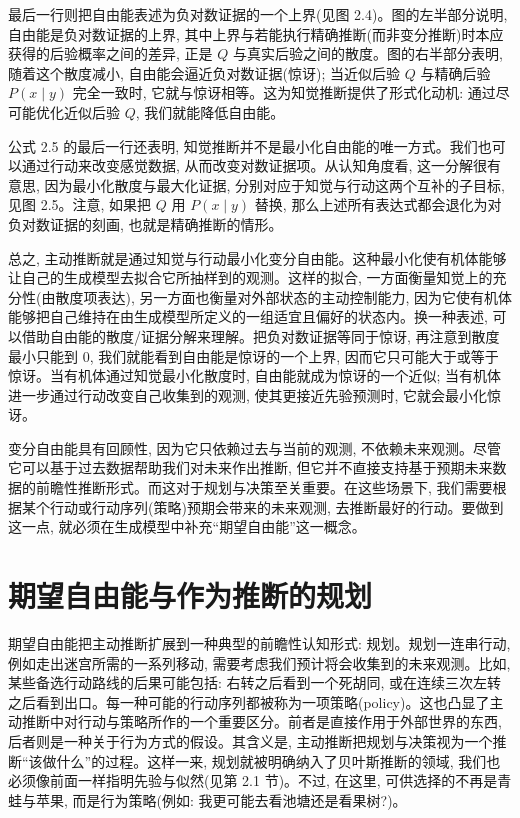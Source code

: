 最后一行则把自由能表述为负对数证据的一个上界(见图 2.4)。图的左半部分说明, 自由能是负对数证据的上界, 其中上界与若能执行精确推断(而非变分推断)时本应获得的后验概率之间的差异, 正是 $Q$ 与真实后验之间的散度。图的右半部分表明, 随着这个散度减小, 自由能会逼近负对数证据(惊讶); 当近似后验 $Q$ 与精确后验 $P(x \mid y)$ 完全一致时, 它就与惊讶相等。这为知觉推断提供了形式化动机: 通过尽可能优化近似后验 $Q$, 我们就能降低自由能。

公式 2.5 的最后一行还表明, 知觉推断并不是最小化自由能的唯一方式。我们也可以通过行动来改变感觉数据, 从而改变对数证据项。从认知角度看, 这一分解很有意思, 因为最小化散度与最大化证据, 分别对应于知觉与行动这两个互补的子目标, 见图 2.5。注意, 如果把 $Q$ 用 $P(x \mid y)$ 替换, 那么上述所有表达式都会退化为对负对数证据的刻画, 也就是精确推断的情形。

总之, 主动推断就是通过知觉与行动最小化变分自由能。这种最小化使有机体能够让自己的生成模型去拟合它所抽样到的观测。这样的拟合, 一方面衡量知觉上的充分性(由散度项表达), 另一方面也衡量对外部状态的主动控制能力, 因为它使有机体能够把自己维持在由生成模型所定义的一组适宜且偏好的状态内。换一种表述, 可以借助自由能的散度/证据分解来理解。把负对数证据等同于惊讶, 再注意到散度最小只能到 $0$, 我们就能看到自由能是惊讶的一个上界, 因而它只可能大于或等于惊讶。当有机体通过知觉最小化散度时, 自由能就成为惊讶的一个近似; 当有机体进一步通过行动改变自己收集到的观测, 使其更接近先验预测时, 它就会最小化惊讶。

变分自由能具有回顾性, 因为它只依赖过去与当前的观测, 不依赖未来观测。尽管它可以基于过去数据帮助我们对未来作出推断, 但它并不直接支持基于预期未来数据的前瞻性推断形式。而这对于规划与决策至关重要。在这些场景下, 我们需要根据某个行动或行动序列(策略)预期会带来的未来观测, 去推断最好的行动。要做到这一点, 就必须在生成模型中补充``期望自由能''这一概念。

\section{期望自由能与作为推断的规划}

期望自由能把主动推断扩展到一种典型的前瞻性认知形式: 规划。规划一连串行动, 例如走出迷宫所需的一系列移动, 需要考虑我们预计将会收集到的未来观测。比如, 某些备选行动路线的后果可能包括: 右转之后看到一个死胡同, 或在连续三次左转之后看到出口。每一种可能的行动序列都被称为一项策略(policy)。这也凸显了主动推断中对行动与策略所作的一个重要区分。前者是直接作用于外部世界的东西, 后者则是一种关于行为方式的假设。其含义是, 主动推断把规划与决策视为一个推断``该做什么''的过程。这样一来, 规划就被明确纳入了贝叶斯推断的领域, 我们也必须像前面一样指明先验与似然(见第 2.1 节)。不过, 在这里, 可供选择的不再是青蛙与苹果, 而是行为策略(例如: 我更可能去看池塘还是看果树?)。

